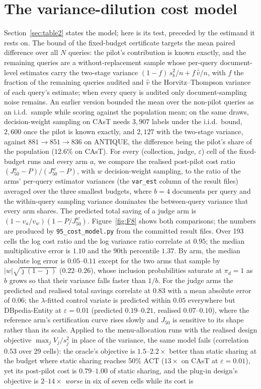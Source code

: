 \documentclass{article}
\newcommand{\eps}{\varepsilon}
\newcommand{\ACT}{\mathrm{ACT}}
\newcommand{\Jfifty}{J_{50}}
\begin{document}
\section{The variance-dilution cost model}\label{app:costmodel}
Section~\ref{sec:table2} states the model; here is its test, preceded by the estimand it rests on. The bound of the fixed-budget certificate targets the mean paired difference over all $N$ queries: the pilot's contribution is known exactly, and the remaining queries are a without-replacement sample whose per-query document-level estimates carry the two-stage variance $(1-f)\,s_b^2/n+f\,\overline{\hat v}/n$, with $f$ the fraction of the remaining queries audited and $\hat v$ the Horvitz--Thompson variance of each query's estimate; when every query is audited only document-sampling noise remains. An earlier version bounded the mean over the non-pilot queries as an i.i.d.\ sample while scoring against the population mean; on the same draws, decision-weight sampling on CAsT needs $3{,}907$ labels under the i.i.d.\ bound, $2{,}600$ once the pilot is known exactly, and $2{,}127$ with the two-stage variance, against $881\to851\to836$ on ANTIQUE, the difference being the pilot's share of the population ($12.6\%$ on CAsT). For every (collection, judge, $\eps$) cell of the fixed-budget runs and every arm $a$, we compare the realised post-pilot cost ratio $(\Jfifty^{a}-P)/(\Jfifty^{w}-P)$, with $w$ decision-weight sampling, to the ratio of the arms' per-query estimator variances (the \texttt{var\_est} column of the result files) averaged over the three smallest budgets, where $b=4$ documents per query and the within-query sampling variance dominates the between-query variance that every arm shares. The predicted total saving of a judge arm is $(1-v_a/v_w)(1-P/\Jfifty^{w})$. Figure~\ref{fig:F8} shows both comparisons; the numbers are produced by \texttt{95\_cost\_model.py} from the committed result files. Over 193 cells the log cost ratio and the log variance ratio correlate at $0.95$; the median multiplicative error is $1.10$ and the 90th percentile $1.37$. By arm, the median absolute log error is $0.05$--$0.11$ except for the two arms that sample by $|w|\sqrt{\hat\jmath(1-\hat\jmath)}$ ($0.22$--$0.26$), whose inclusion probabilities saturate at $\pi_d=1$ as $b$ grows so that their variance falls faster than $1/b$. For the judge arms the predicted and realised total savings correlate at $0.83$ with a mean absolute error of $0.06$; the $\lambda$-fitted control variate is predicted within $0.05$ everywhere but DBpedia-Entity at $\eps=0.01$ (predicted $0.19$--$0.21$, realised $0.07$--$0.10$), where the reference arm's certification curve rises slowly and $\Jfifty$ is sensitive to its shape rather than its scale. Applied to the menu-allocation runs with the realised design objective $\max_j V_j/s_j^2$ in place of the variance, the same model fails (correlation $0.53$ over 29 cells): the oracle's objective is $1.5$--$2.2\times$ better than static sharing at the budget where static sharing reaches 50\% $\ACT$ ($13\times$ on CAsT at $\eps=0.01$), yet its post-pilot cost is $0.79$--$1.00$ of static sharing, and the plug-in design's objective is $2$--$14\times$ \emph{worse} in six of seven cells while its cost is 
\end{document}
